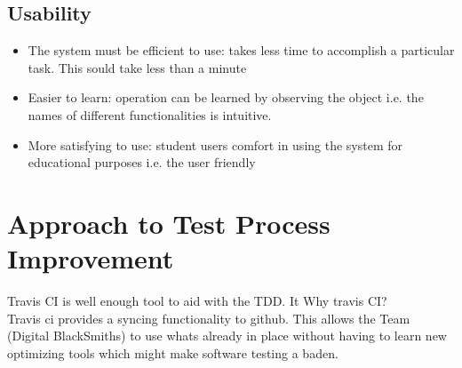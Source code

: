 \documentclass[a4paper,12pt]{article}
\begin{document}
	\subsection{Usability}
	\begin{itemize}
		\item The system must be efficient to use: takes less time to accomplish a particular task. This sould take less than a minute
		\item Easier to learn: operation can be learned by observing the object i.e. the names of different functionalities is intuitive.
		\item More satisfying to use: student users comfort in using the system for educational purposes i.e. the user friendly
	\end{itemize}
	
	\section{Approach to Test Process Improvement}
	
	Travis CI is well enough tool to aid with the TDD. It 
	Why travis CI? \\
	Travis ci provides a syncing functionality to github. 
	This allows the Team (Digital BlackSmiths) to use whats already in place without having to learn new optimizing tools which might make software testing a baden. 
\end{document}
